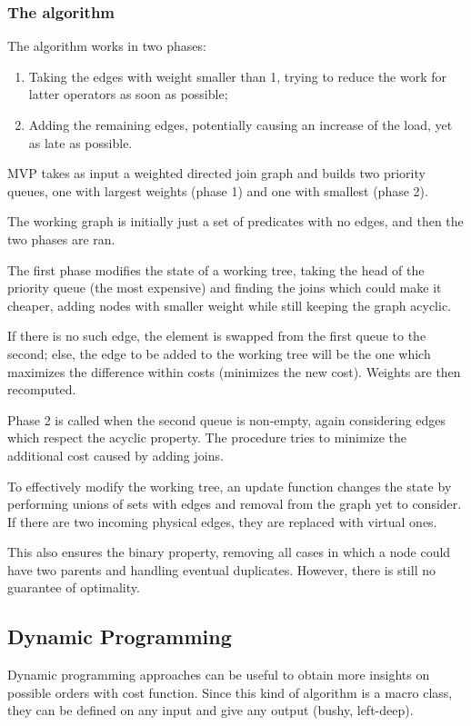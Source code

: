 \subsubsection{The algorithm}
The algorithm works in two phases:
\begin{enumerate}
	\item Taking the edges with weight smaller than 1, trying to reduce the work for latter operators as soon as possible;
	\item Adding the remaining edges, potentially causing an increase of the load, yet as late as possible.
\end{enumerate}
MVP takes as input a weighted directed join graph and builds two priority queues, one with largest weights (phase 1) and one with smallest (phase 2). 

The working graph is initially just a set of predicates with no edges, and then the two phases are ran.

The first phase modifies the state of a working tree, taking the head of the priority queue (the most expensive) and finding the joins which could make it cheaper, adding nodes with smaller weight while still keeping the graph acyclic.

If there is no such edge, the element is swapped from the first queue to the second; else, the edge to be added to the working tree will be the one which maximizes the difference within costs (minimizes the new cost). Weights are then recomputed. 

Phase 2 is called when the second queue is non-empty, again considering edges which respect the acyclic property. The procedure tries to minimize the additional cost caused by adding joins. 

To effectively modify the working tree, an update function changes the state by performing unions of sets with edges and removal from the graph yet to consider. If there are two incoming physical edges, they are replaced with virtual ones. 

This also ensures the binary property, removing all cases in which a node could have two parents and handling eventual duplicates. However, there is still no guarantee of optimality. 

\subsection{Dynamic Programming}
Dynamic programming approaches can be useful to obtain more insights on possible orders with cost function. Since this kind of algorithm is a macro class, they can be defined on any input and give any output (bushy, left-deep).

